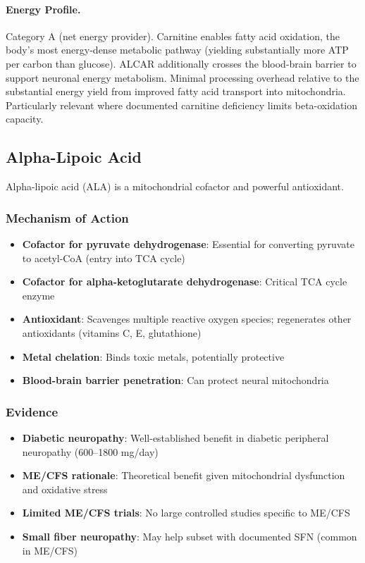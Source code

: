 \paragraph{Energy Profile.}
Category A (net energy provider). Carnitine enables fatty acid oxidation, the body's most energy-dense metabolic pathway (yielding substantially more ATP per carbon than glucose). ALCAR additionally crosses the blood-brain barrier to support neuronal energy metabolism. Minimal processing overhead relative to the substantial energy yield from improved fatty acid transport into mitochondria. Particularly relevant where documented carnitine deficiency limits beta-oxidation capacity.

\subsection{Alpha-Lipoic Acid}

Alpha-lipoic acid (ALA) is a mitochondrial cofactor and powerful antioxidant.

\subsubsection{Mechanism of Action}

\begin{itemize}
    \item \textbf{Cofactor for pyruvate dehydrogenase}: Essential for converting pyruvate to acetyl-CoA (entry into TCA cycle)
    \item \textbf{Cofactor for alpha-ketoglutarate dehydrogenase}: Critical TCA cycle enzyme
    \item \textbf{Antioxidant}: Scavenges multiple reactive oxygen species; regenerates other antioxidants (vitamins C, E, glutathione)
    \item \textbf{Metal chelation}: Binds toxic metals, potentially protective
    \item \textbf{Blood-brain barrier penetration}: Can protect neural mitochondria
\end{itemize}

\subsubsection{Evidence}

\begin{itemize}
    \item \textbf{Diabetic neuropathy}: Well-established benefit in diabetic peripheral neuropathy (600--1800 mg/day)
    \item \textbf{ME/CFS rationale}: Theoretical benefit given mitochondrial dysfunction and oxidative stress
    \item \textbf{Limited ME/CFS trials}: No large controlled studies specific to ME/CFS
    \item \textbf{Small fiber neuropathy}: May help subset with documented SFN (common in ME/CFS)
\end{itemize}


